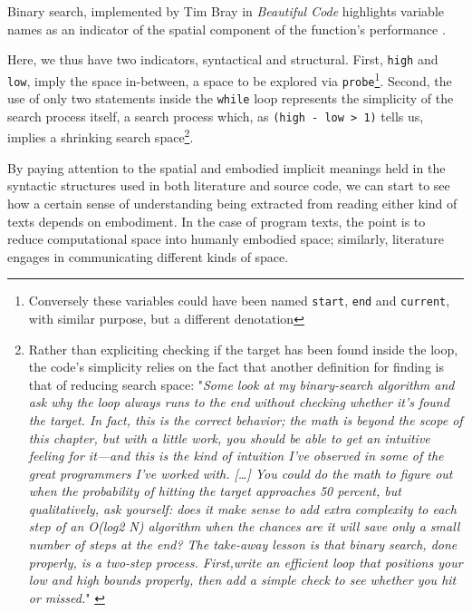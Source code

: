 \begin{listing}
    \inputminted[]{java}{./corpus/binary.java}
    \caption{Binary search, implemented by Tim Bray in \emph{Beautiful Code} highlights variable names as an indicator of the spatial component of the function's performance \citep{bray_finding_2007}.}
    \label{code:binary-search}
\end{listing}

Here, we thus have two indicators, syntactical and structural. First, \lstinline{high} and \lstinline{low}, imply the space in-between, a space to be explored via \lstinline{probe}\footnote{Conversely these variables could have been named \lstinline{start}, \lstinline{end} and \lstinline{current}, with similar purpose, but a different denotation}. Second, the use of only two statements inside the \lstinline{while} loop represents the simplicity of the search process itself, a search process which, as \lstinline{(high - low > 1)} tells us, implies a shrinking search space\footnote{Rather than expliciting checking if the target has been found inside the loop, the code's simplicity relies on the fact that another definition for finding is that of reducing search space: "\emph{Some look at my binary-search algorithm and ask why the loop always runs to the end without checking whether it's found the target. In fact, this is the correct behavior; the math is beyond the scope of this chapter, but with a little work, you should be able to get an intuitive feeling for it—and this is the kind of intuition I've observed in some of the great programmers I've worked with. [\dots] You could do the math to figure out when the probability of hitting the target approaches 50 percent, but qualitatively, ask yourself: does it make sense to add extra complexity to each step of an O(log2 N) algorithm when the chances are it will save only a small number of steps at the end?  The take-away lesson is that binary search, done properly, is a two-step process. First,write an efficient loop that positions your low and high bounds properly, then add a simple check to see whether you hit or missed.}" \citep{bray_finding_2007}}.

By paying attention to the spatial and embodied implicit meanings held in the syntactic structures used in both literature and source code, we can start to see how a certain sense of understanding being extracted from reading either kind of texts depends on embodiment. In the case of program texts, the point is to reduce computational space into humanly embodied space; similarly, literature engages in communicating different kinds of space.

